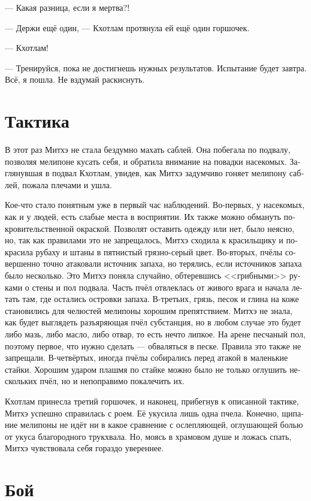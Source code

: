 \documentclass[a4paper,12pt,fleqn]{book}\usepackage{cooltooltips}\usepackage{polyglossia}\setdefaultlanguage{russian}\setotherlanguage{english}\defaultfontfeatures{Ligatures=TeX,Mapping=tex-text} \usepackage{xcolor}\definecolor{lightgray}{HTML}{bbbbbb}\color{lightgray}\newcommand{\ml}[3]{\textenglish{\textcolor{black}{#3}}}
\begin{document}
--- Какая разница, если я мертва?!

--- Держи ещё один, --- Кхотлам протянула ей ещё один горшочек.

--- Кхотлам!

--- Тренируйся, пока не достигнешь нужных результатов.
Испытание будет завтра.
Всё, я пошла.
Не вздумай раскиснуть.

\section{Тактика}

В этот раз Митхэ не стала бездумно махать саблей.
Она побегала по подвалу, позволяя мелипоне кусать себя, и обратила внимание на повадки насекомых.
Заглянувшая в подвал Кхотлам, увидев, как Митхэ задумчиво гоняет мелипону саблей, пожала плечами и ушла.

Кое-что стало понятным уже в первый час наблюдений.
Во-первых, у насекомых, как и у людей, есть слабые места в восприятии.
Их также можно обмануть покровительственной окраской.
Позволят оставить одежду или нет, было неясно, но, так как правилами это не запрещалось, Митхэ сходила к красильщику и покрасила рубаху и штаны в пятнистый грязно-серый цвет.
Во-вторых, пчёлы совершенно точно атаковали источник запаха, но терялись, если источников запаха было несколько.
Это Митхэ поняла случайно, обтеревшись <<грибными>> руками о стены и пол подвала.
Часть пчёл отвлеклась от живого врага и начала летать там, где остались островки запаха.
В-третьих, грязь, песок и глина на коже становились для челюстей мелипоны хорошим препятствием.
Митхэ не знала, как будет выглядеть разъяряющая пчёл субстанция, но в любом случае это будет либо мазь, либо масло, либо отвар, то есть нечто липкое.
На арене песчаный пол, поэтому первое, что нужно сделать --- обваляться в песке.
Правила это также не запрещали.
В-четвёртых, иногда пчёлы собирались перед атакой в маленькие стайки.
Хорошим ударом плашмя по стайке можно было не только оглушить нескольких пчёл, но и непоправимо покалечить их.

Кхотлам принесла третий горшочек, и наконец, прибегнув к описанной тактике, Митхэ успешно справилась с роем.
Её укусила лишь одна пчела.
Конечно, щипание мелипоны не идёт ни в какое сравнение с ослепляющей, оглушающей болью от укуса благородного трукхвала.
Но, моясь в храмовом душе и ложась спать, Митхэ чувствовала себя гораздо увереннее.

\section{Бой}
\end{document}
